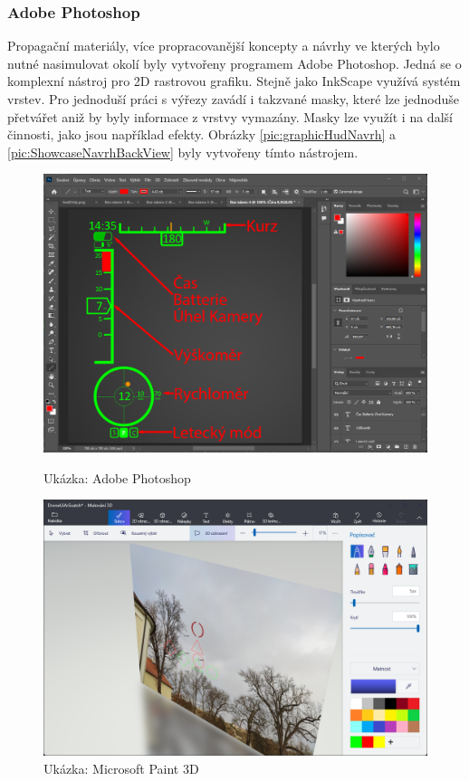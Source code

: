 \subsubsection{Adobe Photoshop}
Propagační materiály, více propracovanější koncepty a návrhy ve kterých bylo nutné nasimulovat okolí byly vytvořeny programem Adobe Photoshop. Jedná se o komplexní nástroj pro 2D rastrovou grafiku. Stejně jako InkScape využívá systém vrstev. Pro jednoduší práci s výřezy zavádí i takzvané masky, které lze jednoduše přetvářet aniž by byly informace z vrstvy vymazány. Masky lze využít i na další činnosti, jako jsou například efekty. Obrázky \ref{pic:graphicHudNavrh} a \ref{pic:ShowcaseNavrhBackView} byly vytvořeny tímto nástrojem.

    
\begin{figure}[h]
  \begin{minipage}{0.45\textwidth}
    \centering
    \includegraphics[width=\textwidth]{obrazky-figures/navrh/photoshop.png}
    \caption{Ukázka: Adobe Photoshop} 
    \label{pic:50}
  \end{minipage}
  \hfill
  \begin{minipage}{0.5\textwidth}
    \centering
    \includegraphics[width=\textwidth]{obrazky-figures/navrh/malovani3d.png}
    \caption{Ukázka: Microsoft Paint 3D} 
    \label{pic:2}
  \end{minipage}
\end{figure}
\newpage
